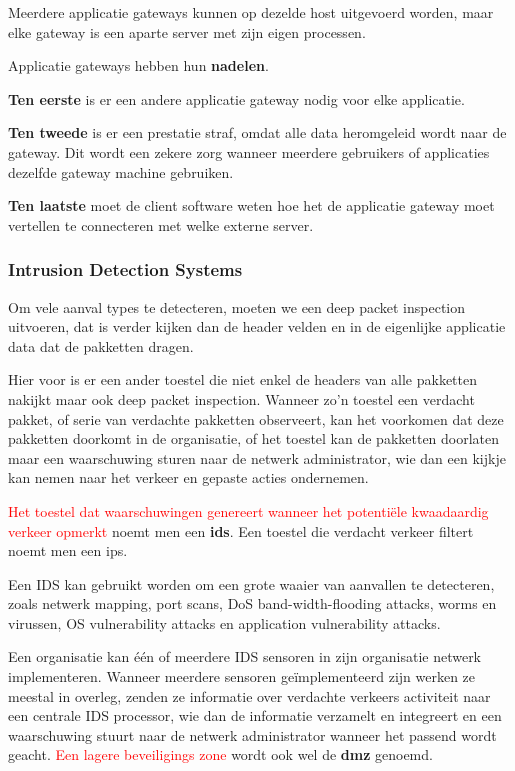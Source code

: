 \noindent Meerdere applicatie gateways kunnen op dezelde host uitgevoerd worden, maar elke gateway is een aparte server met zijn eigen processen.

\noindent Applicatie gateways hebben hun \textbf{nadelen}.

\noindent \textbf{Ten eerste} is er een andere applicatie gateway nodig voor elke applicatie. 

\noindent \textbf{Ten tweede} is er een prestatie straf, omdat alle data heromgeleid wordt naar de gateway. Dit wordt een zekere zorg wanneer meerdere gebruikers of applicaties dezelfde gateway machine gebruiken. 

\textbf{Ten laatste} moet de client software weten hoe het de applicatie gateway moet vertellen te connecteren met welke externe server.

\subsubsection{Intrusion Detection Systems}

\noindent Om vele aanval types te detecteren, moeten we een deep packet inspection uitvoeren, dat is verder kijken dan de header velden en in de eigenlijke applicatie data dat de pakketten dragen.

\noindent Hier voor is er een ander toestel die niet enkel de headers van alle pakketten nakijkt maar ook deep packet inspection. Wanneer zo’n toestel een verdacht pakket, of serie van verdachte pakketten observeert, kan het voorkomen dat deze pakketten doorkomt in de organisatie, of het toestel kan de pakketten doorlaten maar een waarschuwing sturen naar de netwerk administrator, wie dan een kijkje kan nemen naar het verkeer en gepaste acties ondernemen.

\noindent\textcolor{red}{ Het toestel dat waarschuwingen genereert wanneer het potentiële kwaadaardig verkeer opmerkt} noemt men een \textbf{\acrfull{ids}}. Een toestel die verdacht verkeer filtert noemt men een \acrfull{ips}.

\noindent Een IDS kan gebruikt worden om een grote waaier van aanvallen te detecteren, zoals netwerk mapping, port scans, DoS band-width-flooding attacks, worms en virussen, OS vulnerability attacks en application vulnerability attacks.

\noindent Een organisatie kan één of meerdere IDS sensoren in zijn organisatie netwerk implementeren. Wanneer meerdere sensoren geïmplementeerd zijn werken ze meestal in overleg, zenden ze informatie over verdachte verkeers activiteit naar een centrale IDS processor, wie dan de informatie verzamelt en integreert en een waarschuwing stuurt naar de netwerk administrator wanneer het passend wordt geacht. \noindent\textcolor{red}{Een lagere beveiligings zone} wordt ook wel de \textbf{\acrfull{dmz}} genoemd.

